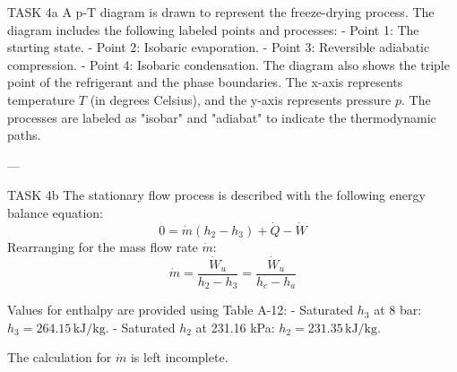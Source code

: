 TASK 4a  
A p-T diagram is drawn to represent the freeze-drying process. The diagram includes the following labeled points and processes:  
- Point 1: The starting state.  
- Point 2: Isobaric evaporation.  
- Point 3: Reversible adiabatic compression.  
- Point 4: Isobaric condensation.  
The diagram also shows the triple point of the refrigerant and the phase boundaries. The x-axis represents temperature \( T \) (in degrees Celsius), and the y-axis represents pressure \( p \). The processes are labeled as "isobar" and "adiabat" to indicate the thermodynamic paths.

---

TASK 4b  
The stationary flow process is described with the following energy balance equation:  
\[
0 = \dot{m} (h_2 - h_3) + \dot{Q} - \dot{W}
\]  
Rearranging for the mass flow rate \( \dot{m} \):  
\[
\dot{m} = \frac{\dot{W}_u}{h_2 - h_3} = \frac{\dot{W}_u}{h_c - h_a}
\]  

Values for enthalpy are provided using Table A-12:  
- Saturated \( h_3 \) at 8 bar: \( h_3 = 264.15 \, \text{kJ/kg} \).  
- Saturated \( h_2 \) at 231.16 kPa: \( h_2 = 231.35 \, \text{kJ/kg} \).  

The calculation for \( \dot{m} \) is left incomplete.